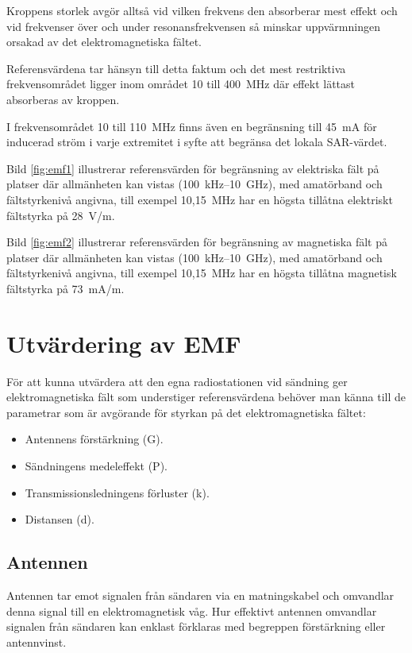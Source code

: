 Kroppens storlek avgör alltså vid vilken frekvens den absorberar mest effekt och
vid frekvenser över och under resonansfrekvensen så minskar uppvärmningen
orsakad av det elektromagnetiska fältet.

Referensvärdena tar hänsyn till detta faktum och det mest restriktiva
frekvensområdet ligger inom området 10 till 400~MHz där effekt lättast
absorberas av kroppen.

I frekvensområdet 10 till 110~MHz finns även en begränsning till 45~mA för
inducerad ström i varje extremitet i syfte att begränsa det lokala SAR-värdet.


Bild \ref{fig:emf1} illustrerar referensvärden för begränsning av elektriska
fält på platser där allmänheten kan vistas (100~kHz--10~GHz), med amatörband
och fältstyrkenivå angivna, till exempel 10,15~MHz har en högsta tillåtna
elektriskt fältstyrka på 28~V/m.


Bild \ref{fig:emf2} illustrerar referensvärden för begränsning av magnetiska
fält på platser där allmänheten kan vistas (100~kHz--10~GHz), med amatörband
och fältstyrkenivå angivna, till exempel 10,15~MHz har en högsta tillåtna
magnetisk fältstyrka på 73~mA/m.

\section{Utvärdering av EMF}

För att kunna utvärdera att den egna radiostationen vid sändning ger
elektromagnetiska fält som understiger referensvärdena behöver man känna till
de parametrar som är avgörande för styrkan på det elektromagnetiska fältet:
\begin{itemize}
  \item Antennens förstärkning (G).
  \item Sändningens medeleffekt (P).
  \item Transmissionsledningens förluster (k).
  \item Distansen (d).
\end{itemize}

\subsection{Antennen}
Antennen tar emot signalen från sändaren via en matningskabel och
omvandlar denna signal till en elektromagnetisk våg.
Hur effektivt antennen omvandlar signalen från sändaren kan enklast förklaras
med begreppen förstärkning eller antennvinst.

